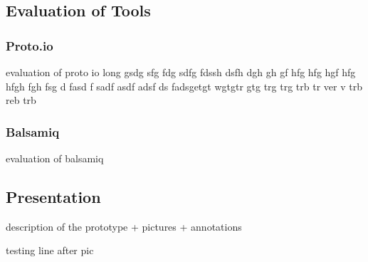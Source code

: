 

\subsection{Evaluation of Tools}


\subsubsection{Proto.io}

evaluation of proto io long gsdg sfg fdg sdfg fdssh dsfh dgh gh gf
hfg hfg hgf hfg hfgh fgh fsg d fasd f sadf asdf adsf ds fadsgetgt
wgtgtr gtg trg trg trb tr ver v trb reb trb 


\subsubsection{Balsamiq}

evaluation of balsamiq


\subsection{Presentation}

description of the prototype + pictures + annotations


testing line after pic

